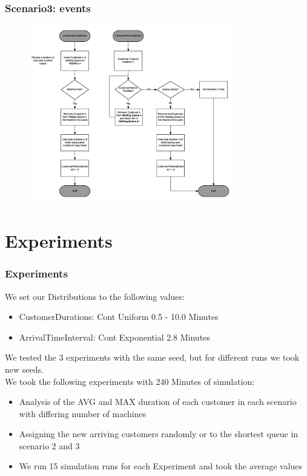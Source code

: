 \documentclass{beamer}
\begin{document}
\begin{frame}
\frametitle{Scenario3: events}
\begin{figure}
\centering
\includegraphics[width=0.8\textwidth]{images/scenario3_diag.png}
\end{figure}
\end{frame}

\section{Experiments}
\begin{frame}
\frametitle{Experiments}
We set our Distributions to the following values:
\begin{itemize}
\item CustomerDurations: Cont Uniform 0.5 - 10.0 Minutes
\item ArrivalTimeInterval: Cont Exponential 2.8 Minutes
\end{itemize}
We tested the 3 experiments with the same seed, but for different runs we took new seeds.\\
We took the following experiments with 240 Minutes of simulation:
\begin{itemize}
\item Analysis of the AVG and MAX duration of each customer in each scenario with differing number of machines
\item Assigning the new arriving customers randomly or to the shortest queue in scenario 2 and 3
\item We run 15 simulation runs for each Experiment and took the average values
\end{itemize}
\end{frame}
\end{document}
